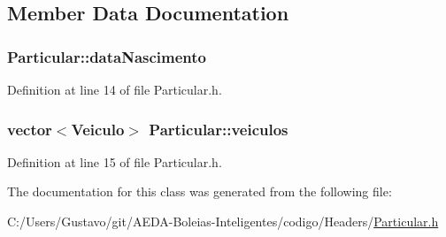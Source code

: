\subsection{Member Data Documentation}
\hypertarget{class_particular_ac1e89ce3d018c9d22249bdd0393988a8}{
\subsubsection[{data\+Nascimento}]{ Particular\+::data\+Nascimento\hspace{0.3cm}{\ttfamily [private]}}}\label{class_particular_ac1e89ce3d018c9d22249bdd0393988a8}


Definition at line 14 of file Particular.\+h.

\hypertarget{class_particular_a59ecc721e0a2f083d5bc1b4fab84f31c}{
\subsubsection[{veiculos}]{\setlength{\rightskip}{0pt plus 5cm}vector$<${\bf Veiculo}$>$ Particular\+::veiculos\hspace{0.3cm}{\ttfamily [private]}}}\label{class_particular_a59ecc721e0a2f083d5bc1b4fab84f31c}


Definition at line 15 of file Particular.\+h.



The documentation for this class was generated from the following file\+:\begin{DoxyCompactItemize}
\item 
C\+:/\+Users/\+Gustavo/git/\+A\+E\+D\+A-\/\+Boleias-\/\+Inteligentes/codigo/\+Headers/\hyperlink{_particular_8h}{Particular.\+h}\end{DoxyCompactItemize}
